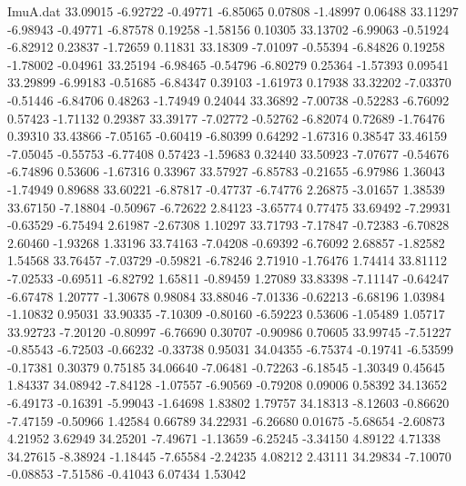 \begin{filecontents}{ImuA.dat}
  33.09015   -6.92722   -0.49771   -6.85065    0.07808   -1.48997    0.06488
  33.11297   -6.98943   -0.49771   -6.87578    0.19258   -1.58156    0.10305
  33.13702   -6.99063   -0.51924   -6.82912    0.23837   -1.72659    0.11831
  33.18309   -7.01097   -0.55394   -6.84826    0.19258   -1.78002   -0.04961
  33.25194   -6.98465   -0.54796   -6.80279    0.25364   -1.57393    0.09541
  33.29899   -6.99183   -0.51685   -6.84347    0.39103   -1.61973    0.17938
  33.32202   -7.03370   -0.51446   -6.84706    0.48263   -1.74949    0.24044
  33.36892   -7.00738   -0.52283   -6.76092    0.57423   -1.71132    0.29387
  33.39177   -7.02772   -0.52762   -6.82074    0.72689   -1.76476    0.39310
  33.43866   -7.05165   -0.60419   -6.80399    0.64292   -1.67316    0.38547
  33.46159   -7.05045   -0.55753   -6.77408    0.57423   -1.59683    0.32440
  33.50923   -7.07677   -0.54676   -6.74896    0.53606   -1.67316    0.33967
  33.57927   -6.85783   -0.21655   -6.97986    1.36043   -1.74949    0.89688
  33.60221   -6.87817   -0.47737   -6.74776    2.26875   -3.01657    1.38539
  33.67150   -7.18804   -0.50967   -6.72622    2.84123   -3.65774    0.77475
  33.69492   -7.29931   -0.63529   -6.75494    2.61987   -2.67308    1.10297
  33.71793   -7.17847   -0.72383   -6.70828    2.60460   -1.93268    1.33196
  33.74163   -7.04208   -0.69392   -6.76092    2.68857   -1.82582    1.54568
  33.76457   -7.03729   -0.59821   -6.78246    2.71910   -1.76476    1.74414
  33.81112   -7.02533   -0.69511   -6.82792    1.65811   -0.89459    1.27089
  33.83398   -7.11147   -0.64247   -6.67478    1.20777   -1.30678    0.98084
  33.88046   -7.01336   -0.62213   -6.68196    1.03984   -1.10832    0.95031
  33.90335   -7.10309   -0.80160   -6.59223    0.53606   -1.05489    1.05717
  33.92723   -7.20120   -0.80997   -6.76690    0.30707   -0.90986    0.70605
  33.99745   -7.51227   -0.85543   -6.72503   -0.66232   -0.33738    0.95031
  34.04355   -6.75374   -0.19741   -6.53599   -0.17381    0.30379    0.75185
  34.06640   -7.06481   -0.72263   -6.18545   -1.30349    0.45645    1.84337
  34.08942   -7.84128   -1.07557   -6.90569   -0.79208    0.09006    0.58392
  34.13652   -6.49173   -0.16391   -5.99043   -1.64698    1.83802    1.79757
  34.18313   -8.12603   -0.86620   -7.47159   -0.50966    1.42584    0.66789
  34.22931   -6.26680    0.01675   -5.68654   -2.60873    4.21952    3.62949
  34.25201   -7.49671   -1.13659   -6.25245   -3.34150    4.89122    4.71338
  34.27615   -8.38924   -1.18445   -7.65584   -2.24235    4.08212    2.43111
  34.29834   -7.10070   -0.08853   -7.51586   -0.41043    6.07434    1.53042

\end{filecontents}
